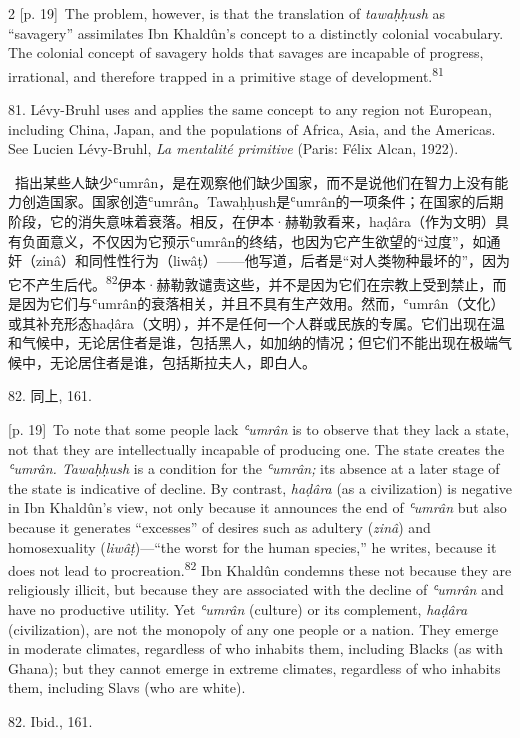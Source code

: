 \documentclass[10pt,a4paper]{article}
\begin{document}
\begin{paracol}{2}
\switchcolumn
{\scriptsize\color{gray} [p. 19]}\ The problem, however, is that the translation of \textit{tawaḥḥush} as “savagery” assimilates Ibn Khaldûn’s concept to a distinctly colonial vocabulary. The colonial concept of savagery holds that savages are incapable of progress, irrational, and therefore trapped in a primitive stage of development.\nobreak\textsuperscript{81}\par{\small 81. Lévy-Bruhl uses and applies the same concept to any region not European, including China, Japan, and the populations of Africa, Asia, and the Americas. See Lucien Lévy-Bruhl, \textit{La mentalité primitive} (Paris: Félix Alcan, 1922).\par}
\switchcolumn*
{\scriptsize\color{gray} [p. 19]}\ 指出某些人缺少ʿumrân，是在观察他们缺少国家，而不是说他们在智力上没有能力创造国家。国家创造ʿumrân。Tawaḥḥush是ʿumrân的一项条件；在国家的后期阶段，它的消失意味着衰落。相反，在伊本·赫勒敦看来，haḍâra（作为文明）具有负面意义，不仅因为它预示ʿumrân的终结，也因为它产生欲望的“过度”，如通奸（zinâ）和同性性行为（liwâṭ）——他写道，后者是“对人类物种最坏的”，因为它不产生后\mbox{代。\textsuperscript{82}}伊本·赫勒敦谴责这些，并不是因为它们在宗教上受到禁止，而是因为它们与ʿumrân的衰落相关，并且不具有生产效用。然而，ʿumrân（文化）或其补充形态haḍâra（文明），并不是任何一个人群或民族的专属。它们出现在温和气候中，无论居住者是谁，包括黑人，如加纳的情况；但它们不能出现在极端气候中，无论居住者是谁，包括斯拉夫人，即白人。\par{\small 82. 同上, 161.\par}
\switchcolumn
{\scriptsize\color{gray} [p. 19]}\ To note that some people lack \textit{ʿumrân} is to observe that they lack a state, not that they are intellectually incapable of producing one. The state creates the \textit{ʿumrân. Tawaḥḥush} is a condition for the \textit{ʿumrân;} its absence at a later stage of the state is indicative of decline. By contrast, \textit{haḍâra} (as a civilization) is negative in Ibn Khaldûn’s view, not only because it announces the end of \textit{ʿumrân} but also because it generates “excesses” of desires such as adultery (\textit{zinâ}) and homosexuality (\textit{liwâṭ})—“the worst for the human species,” he writes, because it does not lead to procreation.\nobreak\textsuperscript{82} Ibn Khaldûn condemns these not because they are religiously illicit, but because they are associated with the decline of \textit{ʿumrân} and have no productive utility. Yet \textit{ʿumrân} (culture) or its complement, \textit{haḍâra} (civilization), are not the monopoly of any one people or a nation. They emerge in moderate climates, regardless of who inhabits them, including Blacks (as with Ghana); but they cannot emerge in extreme climates, regardless of who inhabits them, including Slavs (who are white).\par{\small 82. Ibid., 161.\par}

\end{paracol}
\end{document}
